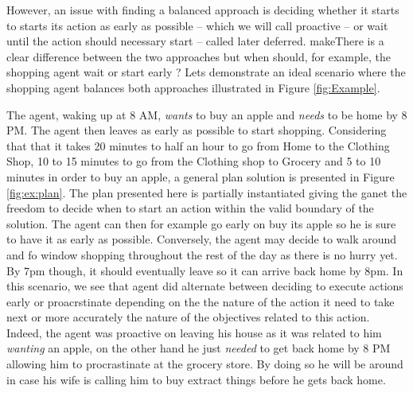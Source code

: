 However, an issue with finding a balanced approach is deciding whether
it starts to starts its action as early as possible -- which we will
call proactive 
-- or wait until the action should necessary start --
called later deferred. 
makeThere is a clear difference between the two approaches
 but when should, for example, the shopping agent wait
or start early ? Lets demonstrate an ideal scenario where the shopping
agent balances both approaches illustrated in Figure \ref{fig:Example}. 

The agent, waking up at 8 AM, {\em wants} to buy an apple
and {\em needs} to be home by 8 PM. The agent then leaves as early as
possible to start shopping. Considering that that it takes 20 minutes
to half an hour to go from Home to the Clothing Shop, 10 to 15 minutes
to go from the Clothing shop to Grocery and 5 to 10 minutes in order
to buy an apple, a general plan solution is presented in  Figure
\ref{fig:ex:plan}. The plan presented here is partially instantiated
giving the ganet the freedom to decide when to start an action within
the valid boundary of the solution. The agent can then for example go
early on buy its apple so he is sure to have it as early as possible. Conversely,
the agent may decide to walk around and fo window shopping throughout
the rest of the day as there is no hurry yet. By 7pm though, it should
eventually leave so it can arrive back home by 8pm. In this scenario,
we see that agent did alternate between deciding to execute actions
early or proacrstinate depending on the the nature of the action it
need to take next or more accurately the nature of the objectives 
related to this action. Indeed, the agent was proactive on leaving his 
house as it was related to him {\em
  wanting}  an apple, on the other hand he just {\em needed} to get
back home by 8 PM allowing him to procrastinate at the grocery 
store. By doing so he will be around in case his wife is calling him
to buy extract things before he gets back home. 


